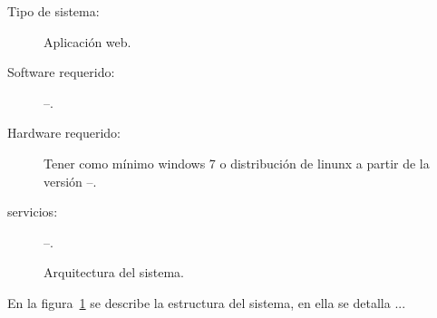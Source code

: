 	
	\begin{description}
		\item[Tipo de sistema:] Aplicación web.
		\item[Software requerido:] --.
		\item[Hardware requerido:] Tener como mínimo windows 7 o distribución de linunx a partir de la versión --.
		\item[servicios:] --.
	\end{description}


\begin{figure}[htbp!]
	\begin{center}
		\caption{Arquitectura del sistema.}
		\label{fig:arquitectura}
	\end{center}
\end{figure}

En la figura~\ref{fig:arquitectura} se describe la estructura del sistema, en ella se detalla ...